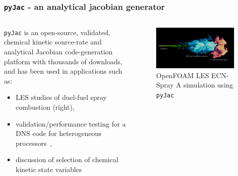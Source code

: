 \documentclass{beamer}
\begin{document}
\begin{frame}
 \frametitle{\texttt{pyJac} - an analytical jacobian generator}
 \begin{columns}[c]
  \begin{column}{0.6\textwidth}
  \begin{minipage}[c]{\columnwidth}
    \texttt{pyJac} is an open-source, validated, chemical kinetic source-rate and analytical Jacobian code-generation platform with thousands of downloads, and has been used in applications such as:
    \begin{itemize}
     \item LES studies of duel-fuel spray combustion (right),
     \item validation\slash performance testing for a DNS code for heterogeneous processors~,
     \item discussion of selection of chemical kinetic state variables~
    \end{itemize}
    \vfill
  \end{minipage}
  \end{column}
  \begin{column}{0.4\textwidth}
    \begin{center}
     \begin{figure}
      \centering
      \includegraphics[width=\columnwidth]{spray.png}
      \caption{OpenFOAM LES ECN-Spray A simulation using \texttt{pyJac}}
     \end{figure}
    \end{center}
  \end{column}
 \end{columns}
\end{frame}
\end{document}
